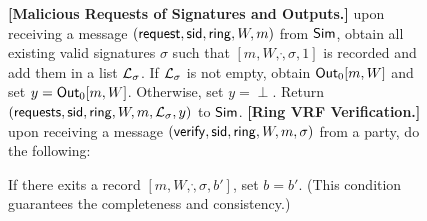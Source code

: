 \begin{figure}
\begin{tcolorbox}[left=2pt,right=2pt]
{			%
			
			\textbf{[Malicious Requests of  Signatures and Outputs.]} upon receiving a message $ (\mathsf{request}, \textsf{sid}, \mathsf{ring}, W, m) $ from $ \mathsf{Sim} $, obtain all existing valid signatures $ \sigma $ such that $ [m,W,\ring,\sigma, 1] $ is recorded and add them in a list $ {\mathcal{L}}_{\sigma} $. If $ {\mathcal{L}}_{\sigma}  $ is not empty, obtain $ {\mathsf{Out}}_0[m,W] $ and set $ y = {\mathsf{Out}}_0[m,W]  $. Otherwise, set $ y = \perp $. Return $ (\mathsf{requests}, \textsf{sid}, \mathsf{ring}, W,m, {\mathcal{L}}_{\sigma},y)  $ to $ \mathsf{Sim} $.
			\textbf{[Ring VRF Verification.]} upon receiving a message $(\mathsf{verify}, \textsf{sid}, \mathsf{ring},W, m, \sigma)$ from a party, do the following: 
			\begin{list}{\hspace*{1pt} C}{,\setlength\leftmargin{0.15in}}
				\item If there exits a record $ [m,W,\ring,\sigma, b'] $, set $ b = b' $. (This condition guarantees the completeness and consistency.)
				

\end{list}}
\end{tcolorbox}
\end{figure}
